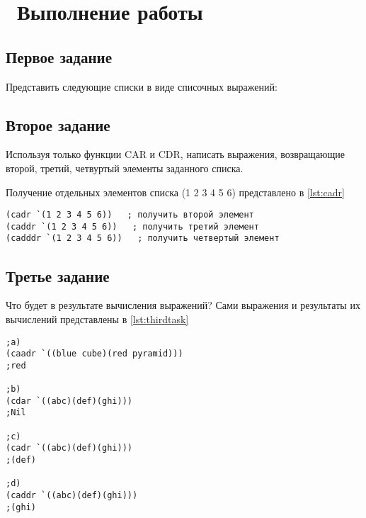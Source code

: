 \chapter{ Выполнение работы}
\label{cha:analysis}

\section{ Первое задание}
Представить следующие списки в виде списочных выражений:

\section{ Второе задание}
Используя только функции CAR и CDR, написать выражения, возвращающие второй, третий, четвуртый элементы заданного списка.

Получение отдельных элементов списка (1 2 3 4 5 6) представлено в \ref{lst:cadr}
\begin{lstlisting}[style=lispStyle, caption={Получение элементов списка с помощью команд car и cdr.},
                    label={lst:cadr}]
(cadr `(1 2 3 4 5 6))   ; получить второй элемент
(caddr `(1 2 3 4 5 6))   ; получить третий элемент
(cadddr `(1 2 3 4 5 6))   ; получить четвертый элемент
\end{lstlisting}

\section{ Третье задание}
Что будет в результате вычисления выражений?
Сами выражения и результаты их вычислений представлены в \ref{lst:thirdtask}
\begin{lstlisting}[style=lispStyle, caption={Получение элементов списка с помощью команд car и cdr.},
                    label={lst:thirdtask}]
;a)
(caadr `((blue cube)(red pyramid)))
;red

;b)
(cdar `((abc)(def)(ghi)))
;Nil

;c)
(cadr `((abc)(def)(ghi)))
;(def)

;d)
(caddr `((abc)(def)(ghi)))
;(ghi)
\end{lstlisting}

